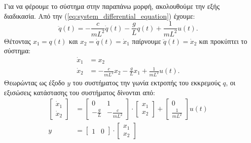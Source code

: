 \documentclass[a4paper,12pt]{article}
\begin{document}
Για να φέρουμε το σύστημα στην παραπάνω μορφή, ακολουθούμε την εξής διαδικασία.
Από την (\ref{eq:system_differential_equation}) έχουμε:
\begin{equation}
    \ddot{q}(t) = -\frac{c}{mL^2}\dot{q}(t) -\frac{g}{L}q(t) +\frac{1}{mL^2} u(t).
    \label{eq:system_differential_equation2}
\end{equation}
Θέτοντας $x_1 = q(t)$ και $x_2 = \dot{q}(t) = \dot{x}_1$ παίρνουμε $\ddot{q}(t) = \dot{x}_2$ και προκύπτει το σύστημα:
\begin{equation}
\begin{aligned}
    \dot{x}_1 &= x_2 \\
    \dot{x}_2 &= -\frac{c}{mL^2}x_2 -\frac{g}{L}x_1 +\frac{1}{mL^2} u(t).
    \label{eq:system_states2}
\end{aligned}
\end{equation}
Θεωρώντας ως έξοδο $y$ του συστήματος την γωνία εκτροπής του εκκρεμούς $q$, οι εξισώσεις κατάστασης του συστήματος
δίνονται από: 
\begin{equation}
\begin{aligned}
    \left[
    \begin{matrix}
        \dot{x}_1 \\
        \dot{x}_2
    \end{matrix}
    \right]
    &=
    \left[
    \begin{matrix}
        0 & 1 \\
        -\frac{g}{L} & -\frac{c}{mL^2}
    \end{matrix}
    \right]
    \cdot
    \left[
    \begin{matrix}
        x_1 \\
        x_2
    \end{matrix}
    \right]
    +
    \left[
    \begin{matrix}
        0 \\
        \frac{1}{mL^2}
    \end{matrix}
    \right]
    u(t)
    \\
    y &= 
    \left[
    \begin{matrix}
        1 & 0
    \end{matrix}
    \right]
    \cdot
    \left[
    \begin{matrix}
        x_1 \\
        x_2
    \end{matrix}
    \right]
    \label{eq:system_states_final}
\end{aligned}
\end{equation}
\end{document}
